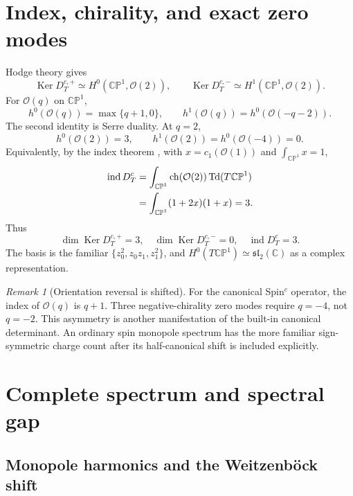 \documentclass[11pt]{article}
\theoremstyle{definition}
\theoremstyle{remark}
\newtheorem{remark}[theorem]{Remark}
\newcommand{\CC}{\mathbb C}
\newcommand{\CP}{\mathbb {CP}}
\newcommand{\cO}{\mathcal O}
\newcommand{\Ker}{\operatorname{Ker}}
\newcommand{\ind}{\operatorname{ind}}
\begin{document}
\section{Index, chirality, and exact zero modes}

Hodge theory gives \cite{Wells2008}
\begin{equation}
 \Ker D_T^{c,+}\simeq H^0(\CP^1,\cO(2)),
 \qquad
 \Ker D_T^{c,-}\simeq H^1(\CP^1,\cO(2)).
 \label{eq:hodge-kernels}
\end{equation}
For \(\cO(q)\) on \(\CP^1\),
\begin{equation}
 h^0(\cO(q))=\max\{q+1,0\},
 \qquad
 h^1(\cO(q))=h^0(\cO(-q-2)).
 \label{eq:line-cohomology}
\end{equation}
The second identity is Serre duality.  At \(q=2\),
\begin{equation}
 h^0(\cO(2))=3,
 \qquad h^1(\cO(2))=h^0(\cO(-4))=0.
 \label{eq:q2-cohomology}
\end{equation}
Equivalently, by the index theorem \cite{AtiyahSinger1968}, with
\(x=c_1(\cO(1))\) and \(\int_{\CP^1}x=1\),
\begin{align}
 \ind D_T^c
 &=\int_{\CP^1}\operatorname{ch}(\cO(2))
 \operatorname{Td}(T\CP^1)\notag\\
 &=\int_{\CP^1}(1+2x)(1+x)=3.
 \label{eq:index-theorem}
\end{align}
Thus
\begin{equation}
 \boxed{\dim\Ker D_T^{c,+}=3,\quad
 \dim\Ker D_T^{c,-}=0,\quad \ind D_T^c=3.}
 \label{eq:three-zero-modes}
\end{equation}
The basis is the familiar
\(\{z_0^2,z_0z_1,z_1^2\}\), and
\(H^0(T\CP^1)\simeq\mathfrak{sl}_2(\CC)\) as a complex representation.

\begin{remark}[Orientation reversal is shifted]
For the canonical Spin\({}^c\) operator, the index of \(\cO(q)\) is \(q+1\).
Three negative-chirality zero modes require \(q=-4\), not \(q=-2\).  This
asymmetry is another manifestation of the built-in canonical determinant.
An ordinary spin monopole spectrum has the more familiar sign-symmetric
charge count after its half-canonical shift is included explicitly.
\end{remark}

\section{Complete spectrum and spectral gap}

\subsection{Monopole harmonics and the Weitzenb\"ock shift}
\end{document}
